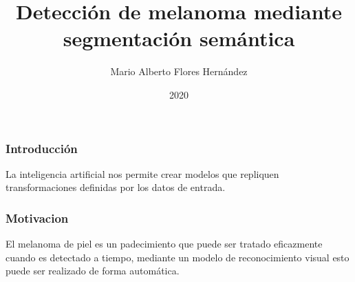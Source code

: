 \documentclass{beamer}
\title{Detección de melanoma mediante segmentación semántica}
\author{Mario Alberto Flores Hernández}
\institute{FIME - UANL}
\date{2020}
\begin{document}
\frame{\titlepage}

\begin{frame}
    \frametitle{Introducción}
    La inteligencia artificial nos permite crear modelos que repliquen transformaciones definidas por los datos de entrada.
\end{frame}

\begin{frame}
    \frametitle{Motivacion}
    El melanoma de piel es un padecimiento que puede ser tratado eficazmente cuando es detectado a tiempo, mediante un modelo de reconocimiento visual esto puede ser realizado de forma automática.
\end{frame}
\end{document}
